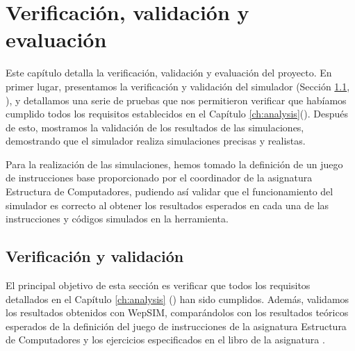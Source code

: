 \chead[]{}
\renewcommand{\headrulewidth}{0.5pt}

\lfoot[]{}
\cfoot[]{}
\rfoot[]{}
\renewcommand{\footrulewidth}{0pt}

\chapter{Verificación, validación y evaluación}
\label{ch:verification_validation_and_evaluation}


Este capítulo detalla la verificación, validación y evaluación del proyecto. En primer lugar, presentamos la verificación y validación del simulador (Sección \ref{sec:verification_and_validation}, \textit{}), y detallamos una serie de pruebas que nos permitieron verificar que habíamos cumplido todos los requisitos establecidos en el Capítulo  \ref{ch:analysis}(\textit{}). Después de esto, mostramos la validación de los resultados de las simulaciones, demostrando que el simulador realiza simulaciones precisas y realistas.

Para la realización de las simulaciones, hemos tomado la definición de un juego de instrucciones base proporcionado por el coordinador de la asignatura Estructura de Computadores, pudiendo así validar que el funcionamiento del simulador es correcto al obtener los resultados esperados en cada una de las instrucciones y códigos simulados en la herramienta. 

\section{Verificación y validación}
\label{sec:verification_and_validation}

El principal objetivo de esta sección es verificar que todos los requisitos detallados en el Capítulo \ref{ch:analysis} (\textit{}) han sido cumplidos. Además, validamos los resultados obtenidos con WepSIM, comparándolos con los resultados teóricos esperados de la definición del juego de instrucciones de la asignatura Estructura de Computadores y los ejercicios especificados en el libro de la asignatura \cite{perez2015problemas}.


